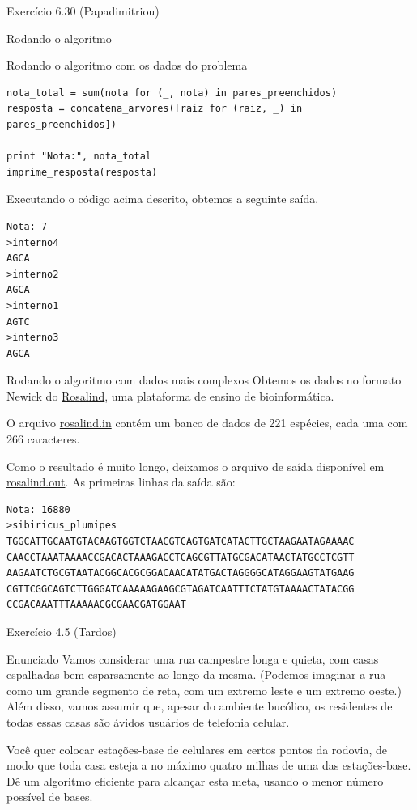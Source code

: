 \documentclass[presentation]{beamer}
\begin{document}
\begin{frame}[fragile,label=sec-4]{Exercício 6.30 (Papadimitriou)}
\begin{block}{Rodando o algoritmo}
\begin{block}{Rodando o algoritmo com os dados do problema}
\begin{verbatim}
nota_total = sum(nota for (_, nota) in pares_preenchidos)
resposta = concatena_arvores([raiz for (raiz, _) in pares_preenchidos])

print "Nota:", nota_total
imprime_resposta(resposta)
\end{verbatim}

Executando o código acima descrito, obtemos a seguinte saída.

\begin{verbatim}
Nota: 7
>interno4
AGCA
>interno2
AGCA
>interno1
AGTC
>interno3
AGCA
\end{verbatim}
\end{block}

\begin{block}{Rodando o algoritmo com dados mais complexos}
Obtemos os dados no formato Newick do \href{http://rosalind.info}{Rosalind}, uma plataforma de
ensino de bioinformática.

O arquivo \href{https://github.com/adusca/FGV-EDA/blob/master/6_30/rosalind.in}{rosalind.in} contém um banco de dados de 221 espécies, cada
uma com 266 caracteres.

Como o resultado é muito longo, deixamos o arquivo de saída disponível
em \href{https://github.com/adusca/FGV-EDA/blob/master/6_30/rosalind.out}{rosalind.out}. As primeiras linhas da saída são:

\begin{verbatim}
Nota: 16880
>sibiricus_plumipes
TGGCATTGCAATGTACAAGTGGTCTAACGTCAGTGATCATACTTGCTAAGAATAGAAAAC
CAACCTAAATAAAACCGACACTAAAGACCTCAGCGTTATGCGACATAACTATGCCTCGTT
AAGAATCTGCGTAATACGGCACGCGGACAACATATGACTAGGGGCATAGGAAGTATGAAG
CGTTCGGCAGTCTTGGGATCAAAAAGAAGCGTAGATCAATTTCTATGTAAAACTATACGG
CCGACAAATTTAAAAACGCGAACGATGGAAT
\end{verbatim}
\end{block}
\end{block}
\end{frame}

\begin{frame}[label=sec-5]{Exercício 4.5 (Tardos)}

\begin{block}{Enunciado}
Vamos considerar uma rua campestre longa e quieta, com casas
espalhadas bem esparsamente ao longo da mesma. (Podemos imaginar a
rua como um grande segmento de reta, com um extremo leste e um
extremo oeste.) Além disso, vamos assumir que, apesar do ambiente
bucólico, os residentes de todas essas casas são ávidos usuários de
telefonia celular.

Você quer colocar estações-base de celulares em certos pontos da
rodovia, de modo que toda casa esteja a no máximo quatro milhas de
uma das estações-base. Dê um algoritmo eficiente para alcançar esta
meta, usando o menor número possível de bases.
\end{block}
\end{frame}
\end{document}
